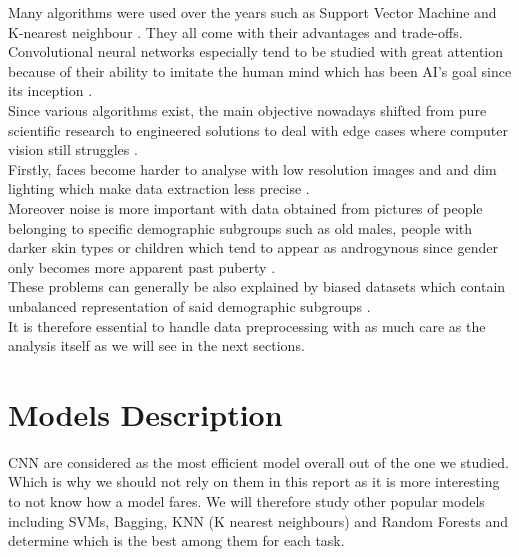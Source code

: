 \documentclass[a4paper,12pt,twoside,twocolumn]{article}
\begin{document}
Many algorithms were used over the years such as Support Vector Machine and K-nearest neighbour \autocite{recognition_algos}. They all come with their advantages and trade-offs. Convolutional neural networks especially tend to be studied with great attention because of their ability to imitate the human mind which has been AI's goal since its inception \autocite{face_detect_cnn} \autocite{thermal_cnn}.\\

Since various algorithms exist, the main objective nowadays shifted from pure scientific research to engineered solutions to deal with edge cases where computer vision still struggles \autocite{face_reading}.\\

Firstly, faces become harder to analyse with low resolution images and and dim lighting which make data extraction less precise \autocite{gender_classify_facehop}.\\

Moreover noise is more important with data obtained from pictures of people belonging to specific demographic subgroups such as old males, people with darker skin types \autocite{face_detect_disparity} or children which tend to appear as androgynous since gender only becomes more apparent past puberty \autocite{gender_classify_children}.\\

These problems can generally be also explained by biased datasets which contain unbalanced representation of said demographic subgroups \autocite{face_detect_bias}.\\

It is therefore essential to handle data preprocessing with as much care as the analysis itself as we will see in the next sections.\\

\section{Models Description}
\label{sec:org495de86}

CNN are considered as the most efficient model overall out of the one we studied. Which is why we should not rely on them in this report as it is more interesting to not know how a model fares. We will therefore study other popular models including SVMs, Bagging, KNN (K nearest neighbours) and Random Forests and determine which is the best among them for each task.\\
\end{document}
